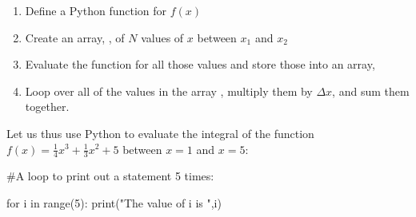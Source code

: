 \begin{enumerate}
\item Define a Python function for $f(x)$
\item Create an array, , of $N$ values of $x$ between $x_1$ and $x_2$
\item Evaluate the function for all those values and store those into an array, 
\item Loop over all of the values in the array , multiply them by $\Delta x$, and sum them together.
\end{enumerate}
Let us thus use Python to evaluate the integral of the function $f(x)=\frac{1}{4}x^3+\frac{1}{3}x^2+5$ between $x=1$ and $x=5$:

\begin{python}[caption=Numerical integration of a function] 
#A loop to print out a statement 5 times:

for i in range(5):
  print("The value of i is ",i)
\end{python}
\begin{poutput}

\end{poutput}